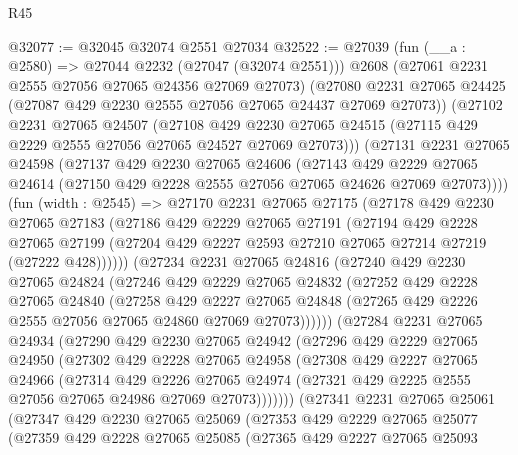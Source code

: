\begin{lexlean}{R45}
\begin{coremodule}
@32077 := @32045 @32074 @2551 @27034
@32522 := @27039
    (fun (__a : @2580) => @27044 @2232 (@27047 (@32074 @2551)))
    @2608
    (@27061 @2231 @2555 @27056 @27065 @24356 @27069 @27073)
    (@27080 @2231 @27065 @24425 (@27087 @429 @2230 @2555 @27056 @27065 @24437 @27069 @27073))
    (@27102
      @2231
      @27065
      @24507
      (@27108
        @429
        @2230
        @27065
        @24515
        (@27115 @429 @2229 @2555 @27056 @27065 @24527 @27069 @27073)))
    (@27131
      @2231
      @27065
      @24598
      (@27137
        @429
        @2230
        @27065
        @24606
        (@27143
          @429
          @2229
          @27065
          @24614
          (@27150 @429 @2228 @2555 @27056 @27065 @24626 @27069 @27073))))
    (fun (width : @2545) =>
    @27170
      @2231
      @27065
      @27175
      (@27178
        @429
        @2230
        @27065
        @27183
        (@27186
          @429
          @2229
          @27065
          @27191
          (@27194
            @429
            @2228
            @27065
            @27199
            (@27204 @429 @2227 @2593 @27210 @27065 @27214 @27219 (@27222 @428))))))
    (@27234
      @2231
      @27065
      @24816
      (@27240
        @429
        @2230
        @27065
        @24824
        (@27246
          @429
          @2229
          @27065
          @24832
          (@27252
            @429
            @2228
            @27065
            @24840
            (@27258
              @429
              @2227
              @27065
              @24848
              (@27265 @429 @2226 @2555 @27056 @27065 @24860 @27069 @27073))))))
    (@27284
      @2231
      @27065
      @24934
      (@27290
        @429
        @2230
        @27065
        @24942
        (@27296
          @429
          @2229
          @27065
          @24950
          (@27302
            @429
            @2228
            @27065
            @24958
            (@27308
              @429
              @2227
              @27065
              @24966
              (@27314
                @429
                @2226
                @27065
                @24974
                (@27321 @429 @2225 @2555 @27056 @27065 @24986 @27069 @27073)))))))
    (@27341
      @2231
      @27065
      @25061
      (@27347
        @429
        @2230
        @27065
        @25069
        (@27353
          @429
          @2229
          @27065
          @25077
          (@27359
            @429
            @2228
            @27065
            @25085
            (@27365
              @429
              @2227
              @27065
              @25093

\end{coremodule}
\end{lexlean}
